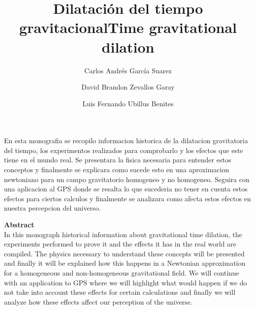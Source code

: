 \documentclass[12pt,twoside]{rif}
\title{\textbf{Dilatación del tiempo gravitacional}}
\author[1]{{\small Carlos Andrés García Suarez}}
\author[1]{{\small David Brandon Zevallos Garay}}
\author[1]{{\small Luis Fernando Ubillus Benites}}
\affil[1]{{ \small Facultad de Ciencias Naturales y Matemática, Universidad
		Nacional Federico Villarreal. El Agustino 15003. Lima-Perú.}}
\date{}
\begin{document}
	\maketitle
	
	\begin{res}
		\begin{center}
			En esta monografia se recopilo informacion historica de la dilatacion gravitatoria del tiempo, los experimentos realizados para comprobarlo y los efectos que este tiene en el mundo real. Se presentara la fisica necesaria para entender estos conceptos y finalmente se explicara como sucede esto en una aproximacion  newtoniano para un campo gravitatorio homogeneo y no homogeneo. Seguira con una aplicacion al GPS donde se resalta lo que sucederia no tener en cuenta estos efectos para ciertos calculos y finalmente se analizara como afecta estos efectos en nuestra percepcion del universo.
		\end{center}
		
		\par
		\smallskip
	\end{res}
	\begin{center}
		\title{\textbf{Time gravitational dilation}}
	\end{center}
	
	\begin{abst}
		\begin{center}
			\textbf{Abstract} \\
			In this monograph historical information about gravitational time dilation, the experiments performed to prove it and the effects it has in the real world are compiled. The physics necessary to understand these concepts will be presented and finally it will be explained how this happens in a Newtonian approximation for a homogeneous and non-homogeneous gravitational field. We will continue with an application to GPS where we will highlight what would happen if we do not take into account these effects for certain calculations and finally we will analyze how these effects affect our perception of the universe.
		\end{center}
		
		\par 
		\smallskip
	\end{abst}
\end{document}

